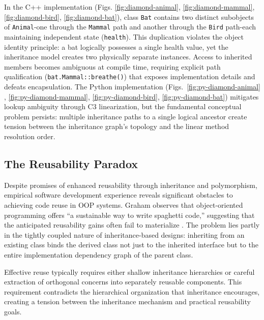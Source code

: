 In the C++ implementation (Figs. \ref{fig:diamond-animal}, \ref{fig:diamond-mammal}, \ref{fig:diamond-bird}, \ref{fig:diamond-bat}), class \texttt{Bat} contains two distinct subobjects of \texttt{Animal}-one through the \texttt{Mammal} path and another through the \texttt{Bird} path-each maintaining independent state (\texttt{health}). This duplication violates the object identity principle: a bat logically possesses a single health value, yet the inheritance model creates two physically separate instances. Access to inherited members becomes ambiguous at compile time, requiring explicit path qualification (\texttt{bat.Mammal::breathe()}) that exposes implementation details and defeats encapsulation. The Python implementation (Figs.~\ref{fig:py-diamond-animal} , \ref{fig:py-diamond-mammal}, \ref{fig:py-diamond-bird}, \ref{fig:py-diamond-bat}) mitigates lookup ambiguity through C3 linearization, but the fundamental conceptual problem persists: multiple inheritance paths to a single logical ancestor create tension between the inheritance graph's topology and the linear method resolution order. 

\subsection{The Reusability Paradox}

Despite promises of enhanced reusability through inheritance and polymorphism, empirical software development experience reveals significant obstacles to achieving code reuse in OOP systems. Graham observes that object-oriented programming offers ``a sustainable way to write spaghetti code,'' suggesting that the anticipated reusability gains often fail to materialize \cite{graham2003}. The problem lies partly in the tightly coupled nature of inheritance-based designs: inheriting from an existing class binds the derived class not just to the inherited interface but to the entire implementation dependency graph of the parent class.

Effective reuse typically requires either shallow inheritance hierarchies or careful extraction of orthogonal concerns into separately reusable components. This requirement contradicts the hierarchical organization that inheritance encourages, creating a tension between the inheritance mechanism and practical reusability goals.


